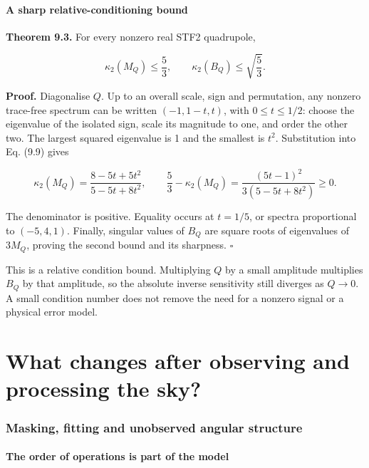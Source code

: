 \documentclass[
  11pt,
  a4paper]{article}
\begin{document}
\hypertarget{a-sharp-relative-conditioning-bound}{%
\subsection{A sharp relative-conditioning bound}\label{a-sharp-relative-conditioning-bound}}

\textbf{Theorem 9.3.} For every nonzero real STF2 quadrupole,

\[
\kappa_2(M_Q)\le\frac53,\qquad
\kappa_2(B_Q)\le\sqrt{\frac53}.
\tag{9.11}
\]

\textbf{Proof.} Diagonalise \(Q\). Up to an overall scale, sign and permutation, any nonzero trace-free spectrum can be written \((-1,1-t,t)\), with \(0\le t\le1/2\): choose the eigenvalue of the isolated sign, scale its magnitude to one, and order the other two. The largest squared eigenvalue is 1 and the smallest is \(t^2\). Substitution into Eq. (9.9) gives

\[
\kappa_2(M_Q)=\frac{8-5t+5t^2}{5-5t+8t^2},\qquad
\frac53-\kappa_2(M_Q)
=\frac{(5t-1)^2}{3(5-5t+8t^2)}\ge0.
\tag{9.12}
\]

The denominator is positive. Equality occurs at \(t=1/5\), or spectra proportional to \((-5,4,1)\). Finally, singular values of \(B_Q\) are square roots of eigenvalues of \(3M_Q\), proving the second bound and its sharpness. \(\square\)

This is a relative condition bound. Multiplying \(Q\) by a small amplitude multiplies \(B_Q\) by that amplitude, so the absolute inverse sensitivity still diverges as \(Q\to0\). A small condition number does not remove the need for a nonzero signal or a physical error model.

\clearpage
\part{What changes after observing and processing the sky?}

\hypertarget{masking-fitting-and-unobserved-angular-structure}{%
\section{Masking, fitting and unobserved angular structure}\label{masking-fitting-and-unobserved-angular-structure}}

\hypertarget{the-order-of-operations-is-part-of-the-model}{%
\subsection{The order of operations is part of the model}\label{the-order-of-operations-is-part-of-the-model}}
\end{document}
